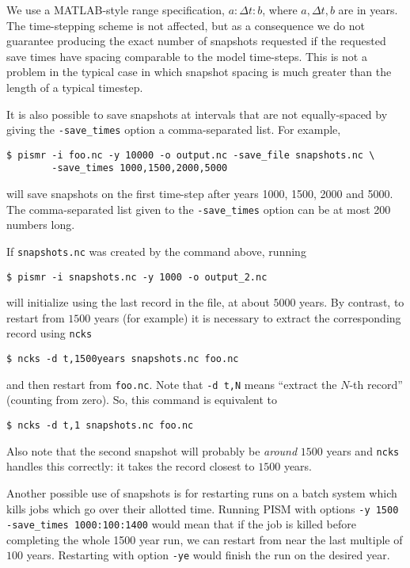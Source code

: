 We use a MATLAB-style range specification, $a:\Delta t:b$, where $a,\Delta t,b$ are in years.  The time-stepping scheme is not affected, but as a consequence we do not guarantee producing the exact number of snapshots requested if the requested save times have spacing comparable to the model time-steps.  This is not a problem in the typical case in which snapshot spacing is much greater than the length of a typical timestep.

It is also possible to save snapshots at intervals that are not equally-spaced
by giving the \texttt{-save_times} option a comma-separated list. For example,
\begin{verbatim}
$ pismr -i foo.nc -y 10000 -o output.nc -save_file snapshots.nc \
        -save_times 1000,1500,2000,5000
\end{verbatim}
will save snapshots on the first time-step after years 1000, 1500, 2000 and 5000.
The comma-separated list given to the \texttt{-save_times} option can be at most 200 numbers long.

If \texttt{snapshots.nc} was created by the command above, running
\begin{verbatim}
$ pismr -i snapshots.nc -y 1000 -o output_2.nc
\end{verbatim}
will initialize using the last record in the file, at about $5000$ years.  By contrast, to restart from $1500$ years (for example) it is necessary to extract the corresponding record using \texttt{ncks}
\begin{verbatim}
$ ncks -d t,1500years snapshots.nc foo.nc
\end{verbatim}
and then restart from \texttt{foo.nc}.  Note that \texttt{-d t,N} means ``extract the $N$-th record'' (counting from zero).  So, this command is equivalent to
\begin{verbatim}
$ ncks -d t,1 snapshots.nc foo.nc
\end{verbatim}
Also note that the second snapshot will probably be \emph{around} $1500$ years and \texttt{ncks} handles this correctly: it takes the record closest to $1500$ years.

Another possible use of snapshots is for restarting runs on a batch system which kills jobs which go over their allotted time.  Running PISM with options \texttt{-y 1500} \texttt{-save_times 1000:100:1400} would mean that if the job is killed before completing the whole 1500 year run, we can restart from near the last multiple of $100$ years.  Restarting with option \texttt{-ye} would finish the run on the desired year.

